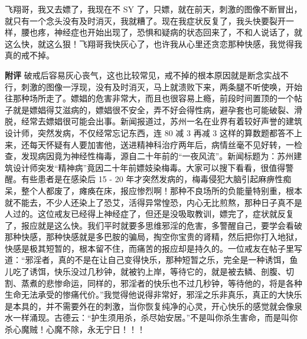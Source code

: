 \begin{case}
    飞翔哥，我又去嫖了，我现在不 SY 了，只嫖，就在前天，刺激的图像不断冒出，就只有一个念头没有及时消灭，我就糟了。现在我症状反复了，我头快要裂开一样，腰也疼，神经症也开始出现了，恐惧和疑病的状态回来了，不和人说话了，就这么快，就这么狠！飞翔哥我快灰心了，也许我从心里还贪恋那种快感，我觉得我真的戒不掉。

    \textbf{附评} 破戒后容易灰心丧气，这也比较常见，戒不掉的根本原因就是断念实战不行，刺激的图像一浮现，没有及时消灭，马上就溃败下来，两条腿不听使唤，开始往那种场所走了。嫖娼的危害非常大，而且也很容易上瘾，前段时间置顶的一个帖子就是嫖娼得艾滋病的，嫖娼很不安全，弄不好会得性病，避孕套也可能破裂、滑脱，经常去嫖娼很可能会出事。新闻报道过，苏州一名在业界有着较好声誉的建筑设计师，突然发病，不仅经常忘记东西，连 80 减 3 再减 3 这样的算数题都答不上来，还每天怀疑有人要加害他，送进精神科治疗两年后，病情丝毫不见好转，一检查，发现病因竟为神经性梅毒，源自二十年前的“一夜风流”。新闻标题为：苏州建筑设计师突发“精神病”竟因二十年前嫖妓染梅毒。大家可以搜下看看，很值得警醒。有些患者是在感染后 15 - 20 年才突然发病的，梅毒侵犯大脑引起麻痹性痴呆，整个人都废了，瘫痪在床，报应惨烈啊！那种不良场所的负能量特别重，根本就不能去，不少人还染上了恐艾，活得异常惶恐，内心无比煎熬，那种日子真不是人过的。这位戒友已经得上神经症了，但还是没吸取教训，嫖完了，症状就反复了，报应就是这么快。我们平时就要多思维邪淫的危害，多警醒自己，要学会看破那种快感，那种快感就是多巴胺的骗局，掏空你宝贵的肾精，然后把你打入地狱，快感是极其短暂的，根本留不住，而痛苦的报应却是持久的。一位戒友在帖子里写道：“邪淫者，真的不是在让自己变得快乐，那种短暂之乐，完全是一种诱饵，鱼儿吃了诱饵，快乐没过几秒钟，就被钓上岸，等待它的，就是被去鳞、剖腹、切割、蒸煮的悲惨命运，同样的，邪淫者的快乐也不过几秒钟，等待他的，将是各种生命无法承受的惨痛代价。”我觉得他说得非常好，邪淫之乐非真乐，真正的大快乐是本具的，并不需要外在的刺激，当你恢复纯净的心灵，开心快乐的感觉就会像泉水一样涌现。古德云：“护生须用杀，杀尽始安居。”不是叫你杀生害命，而是叫你杀心魔贼！心魔不除，永无宁日！！！
\end{case}

